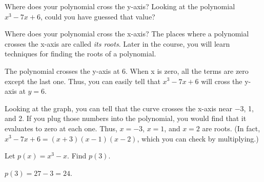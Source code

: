 \begin{Exercise}[title={Observations}, label=plotobservations]
  Where does your polynomial cross the y-axis? Looking at the
  polynomial $x^3 - 7x + 6$, could you have guessed that value?

  \vspace{20mm}
  
  Where does your polynomial cross the x-axis? The places where a
  polynomial crosses the x-axis are called \emph{its roots}. Later in
  the course, you will learn techniques for finding the roots of a
  polynomial.
\end{Exercise}
\begin{Answer}[ref=plotobservations]
  The polynomial crosses the y-axis at 6. When x is zero, all the terms are zero except the
  last one. Thus, you can easily tell that $x^3 - 7x + 6$ will cross the y-axis at $y=6$.

  Looking at the graph, you can tell that the curve crosses the x-axis
  near $-3$, 1, and 2. If you plug those numbers into the polynomial, you
  would find that it evaluates to zero at each one. Thus, $x=-3$, $x=1$, and $x=2$ are roots. (In fact,
$x^3 - 7x + 6 = (x + 3)(x - 1)(x - 2)$, which you can check by
multiplying.)
\end{Answer}

\begin{Exercise}[title={Cubic Polynomial}, label=pl4]
Let $p(x) = x^3 - x$. Find $p(3)$.
\end{Exercise}
\begin{Answer}[ref=pl4]
$p(3) = 27 - 3 = 24$.
\end{Answer}
